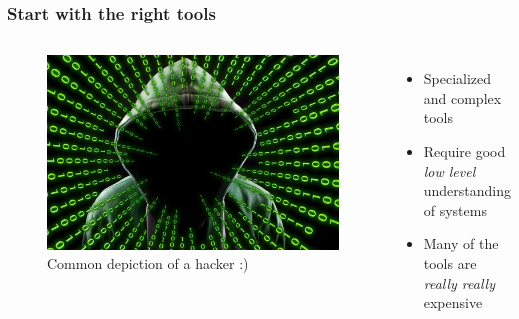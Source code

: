 \documentclass[10pt,xcolor=pdflatex]{beamer}
\begin{document}
\begin{frame}\frametitle{Start with the right tools}

  \begin{columns}
    \begin{figure}
      \centering
      \includegraphics[width=.8\textwidth]{../images/hacker.jpg}
    \caption{Common depiction of a hacker :)}
    \end{figure}
    \begin{itemize}
        \item Specialized and complex tools
        \hfill
        \item Require good \emph{low level} understanding of systems
        \hfill
        \item Many of the tools are \emph{really really} expensive
    \end{itemize}
  \end{columns}

\end{frame}
\end{document}
